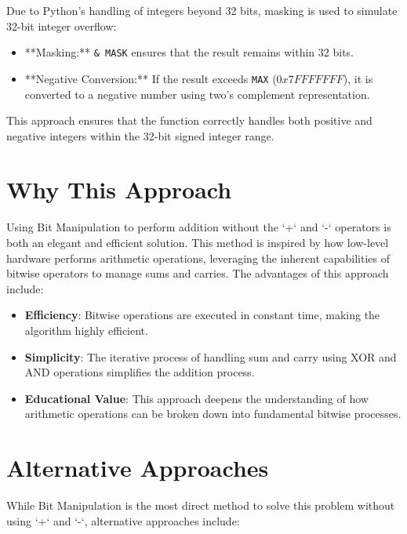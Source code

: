 Due to Python's handling of integers beyond 32 bits, masking is used to simulate 32-bit integer overflow:

\begin{itemize}
    \item **Masking:** \texttt{\& MASK} ensures that the result remains within 32 bits.
    
    \item **Negative Conversion:** If the result exceeds \texttt{MAX} (\(0x7FFFFFFF\)), it is converted to a negative number using two's complement representation.
\end{itemize}

This approach ensures that the function correctly handles both positive and negative integers within the 32-bit signed integer range.

\section*{Why This Approach}

Using Bit Manipulation to perform addition without the `+` and `-` operators is both an elegant and efficient solution. This method is inspired by how low-level hardware performs arithmetic operations, leveraging the inherent capabilities of bitwise operators to manage sums and carries. The advantages of this approach include:

\begin{itemize}
    \item \textbf{Efficiency}: Bitwise operations are executed in constant time, making the algorithm highly efficient.
    
    \item \textbf{Simplicity}: The iterative process of handling sum and carry using XOR and AND operations simplifies the addition process.
    
    \item \textbf{Educational Value}: This approach deepens the understanding of how arithmetic operations can be broken down into fundamental bitwise processes.
\end{itemize}

\section*{Alternative Approaches}

While Bit Manipulation is the most direct method to solve this problem without using `+` and `-`, alternative approaches include:

